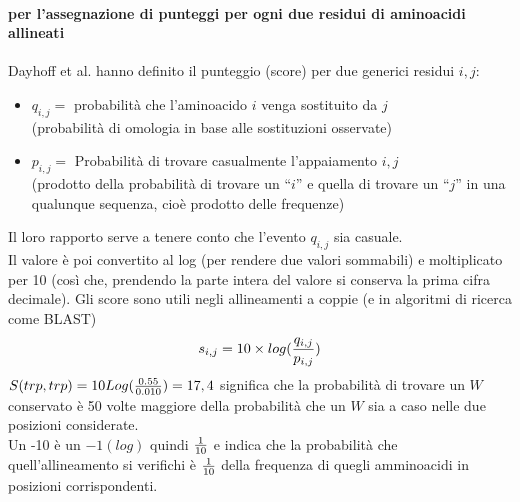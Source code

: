 \documentclass{article}
\begin{document}
\paragraph{per l'assegnazione di punteggi per ogni due residui di aminoacidi allineati}
Dayhoff et al. hanno definito il punteggio (score) per due generici
residui $i,j$:
\begin{itemize}
    \item $q_{i,j} = $ probabilità che l'aminoacido $i$ venga sostituito da $j$\\(probabilità di omologia in base alle sostituzioni osservate)
    \item $p_{i,j} = $ Probabilità di trovare casualmente l'appaiamento $i,j$\\(prodotto della probabilità di trovare un “$i$” e quella di trovare un “$j$” in una
    qualunque sequenza, cioè prodotto delle frequenze)
\end{itemize}
Il loro rapporto serve a tenere conto che l'evento $q_{i,j}$
sia casuale.\\
Il valore è poi convertito al log (per rendere due valori sommabili) e moltiplicato
per 10 (così che, prendendo la parte intera del valore si conserva la prima cifra
decimale). Gli score sono utili negli allineamenti a coppie (e in algoritmi di
ricerca come BLAST)
$$ s_{i,j} = 10 \times log({q_{i,j}\over p_{i,j}})$$
$S(trp,trp) = 10 Log({0.55\over 0.010}) = 17,4$ significa che la probabilità di trovare un
$W$ conservato è 50 volte maggiore della
probabilità che un $W$ sia a caso nelle due
posizioni considerate.\\
Un -10 è un $-1(log)$ quindi ${1\over 10}$ e indica che la probabilità che quell'allineamento si verifichi è ${1\over 10}$ della frequenza di quegli amminoacidi in posizioni corrispondenti.
\end{document}
